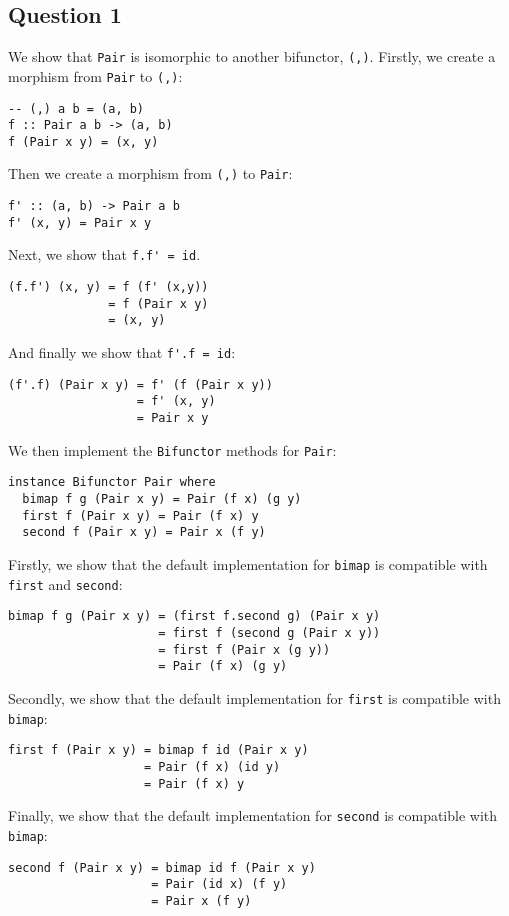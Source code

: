 \subsection{Question 1}

We show that \lstinline{Pair} is isomorphic to another bifunctor,
\lstinline{(,)}. Firstly, we create a morphism from \lstinline{Pair} to
\lstinline{(,)}:

\begin{lstlisting}
-- (,) a b = (a, b)
f :: Pair a b -> (a, b)
f (Pair x y) = (x, y)
\end{lstlisting}

Then we create a morphism from \lstinline{(,)} to \lstinline{Pair}:

\begin{lstlisting}
f' :: (a, b) -> Pair a b
f' (x, y) = Pair x y
\end{lstlisting}

Next, we show that \lstinline{f.f' = id}.

\begin{lstlisting}
(f.f') (x, y) = f (f' (x,y))
              = f (Pair x y)
              = (x, y)
\end{lstlisting}

And finally we show that \lstinline{f'.f = id}:

\begin{lstlisting}
(f'.f) (Pair x y) = f' (f (Pair x y))
                  = f' (x, y)
                  = Pair x y
\end{lstlisting}

We then implement the \lstinline{Bifunctor} methods for \lstinline{Pair}:

\begin{lstlisting}
instance Bifunctor Pair where
  bimap f g (Pair x y) = Pair (f x) (g y)
  first f (Pair x y) = Pair (f x) y
  second f (Pair x y) = Pair x (f y)
\end{lstlisting}

Firstly, we show that the default implementation for \lstinline{bimap} is
compatible with \lstinline{first} and \lstinline{second}:

\begin{lstlisting}
bimap f g (Pair x y) = (first f.second g) (Pair x y)
                     = first f (second g (Pair x y))
                     = first f (Pair x (g y))
                     = Pair (f x) (g y)
\end{lstlisting}

Secondly, we show that the default implementation for \lstinline{first} is
compatible with \lstinline{bimap}:

\begin{lstlisting}
first f (Pair x y) = bimap f id (Pair x y)
                   = Pair (f x) (id y)
                   = Pair (f x) y
\end{lstlisting}

Finally, we show that the default implementation for \lstinline{second} is
compatible with \lstinline{bimap}:

\begin{lstlisting}
second f (Pair x y) = bimap id f (Pair x y)
                    = Pair (id x) (f y)
                    = Pair x (f y)
\end{lstlisting}

